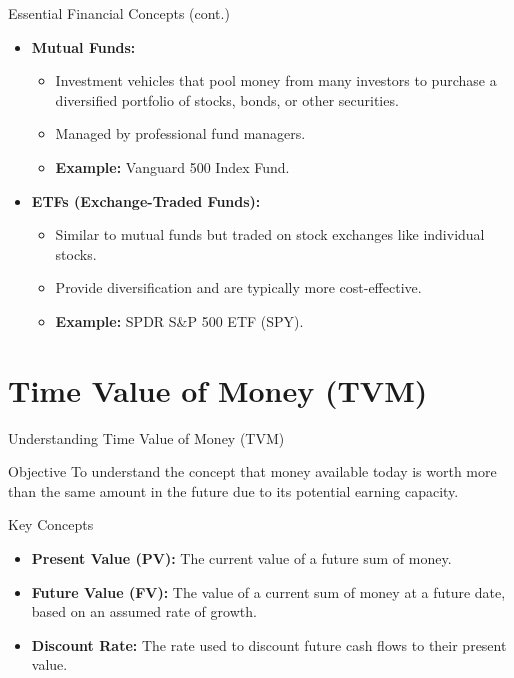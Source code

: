 \documentclass{beamer}
\begin{document}
\begin{frame}{Essential Financial Concepts (cont.)}
    \begin{itemize}
        \item \textbf{Mutual Funds:}
        \begin{itemize}
            \item Investment vehicles that pool money from many investors to purchase a diversified portfolio of stocks, bonds, or other securities.
            \item Managed by professional fund managers.
            \item \textbf{Example:} Vanguard 500 Index Fund.
        \end{itemize}
        \item \textbf{ETFs (Exchange-Traded Funds):}
        \begin{itemize}
            \item Similar to mutual funds but traded on stock exchanges like individual stocks.
            \item Provide diversification and are typically more cost-effective.
            \item \textbf{Example:} SPDR S\&P 500 ETF (SPY).
        \end{itemize}
    \end{itemize}
\end{frame}

\section{Time Value of Money (TVM)}
\begin{frame}{Understanding Time Value of Money (TVM)}
  \begin{block}{Objective}
    To understand the concept that money available today is worth more than the same amount in the future due to its potential earning capacity.
  \end{block}
  \begin{block}{Key Concepts}
    \begin{itemize}
      \item \textbf{Present Value (PV):} The current value of a future sum of money.
      \item \textbf{Future Value (FV):} The value of a current sum of money at a future date, based on an assumed rate of growth.
      \item \textbf{Discount Rate:} The rate used to discount future cash flows to their present value.
    \end{itemize}
  \end{block}
\end{frame}
\end{document}
